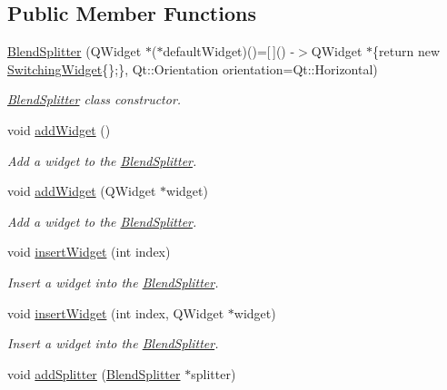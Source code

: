 \subsection*{Public Member Functions}
\begin{DoxyCompactItemize}
\item 
\hyperlink{class_blend_splitter_a8a305d92da45200aa9cc3e7160124cc3}{Blend\+Splitter} (Q\+Widget $\ast$($\ast$default\+Widget)()=\mbox{[}$\,$\mbox{]}() -\/$>$Q\+Widget $\ast$\{return new \hyperlink{class_switching_widget}{Switching\+Widget}\{\};\}, Qt\+::\+Orientation orientation=Qt\+::\+Horizontal)
\begin{DoxyCompactList}\small\item\em \hyperlink{class_blend_splitter}{Blend\+Splitter} class constructor. \end{DoxyCompactList}\item 
void \hyperlink{class_blend_splitter_a9bb010ba4ee756ca4d718acadaffb7cc}{add\+Widget} ()
\begin{DoxyCompactList}\small\item\em Add a widget to the \hyperlink{class_blend_splitter}{Blend\+Splitter}. \end{DoxyCompactList}\item 
void \hyperlink{class_blend_splitter_a305c3aee946a9fb9dcd95fdc72faff8b}{add\+Widget} (Q\+Widget $\ast$widget)
\begin{DoxyCompactList}\small\item\em Add a widget to the \hyperlink{class_blend_splitter}{Blend\+Splitter}. \end{DoxyCompactList}\item 
void \hyperlink{class_blend_splitter_ac26cdfb64fb785a1983a5b7527ce5189}{insert\+Widget} (int index)
\begin{DoxyCompactList}\small\item\em Insert a widget into the \hyperlink{class_blend_splitter}{Blend\+Splitter}. \end{DoxyCompactList}\item 
void \hyperlink{class_blend_splitter_a9c15101a7a0acb30f6cd46ff5259af79}{insert\+Widget} (int index, Q\+Widget $\ast$widget)
\begin{DoxyCompactList}\small\item\em Insert a widget into the \hyperlink{class_blend_splitter}{Blend\+Splitter}. \end{DoxyCompactList}\item 
void \hyperlink{class_blend_splitter_abcee5dda4bde4fdb6fda1f3c1f5b9c9a}{add\+Splitter} (\hyperlink{class_blend_splitter}{Blend\+Splitter} $\ast$splitter)

\end{DoxyCompactItemize}
